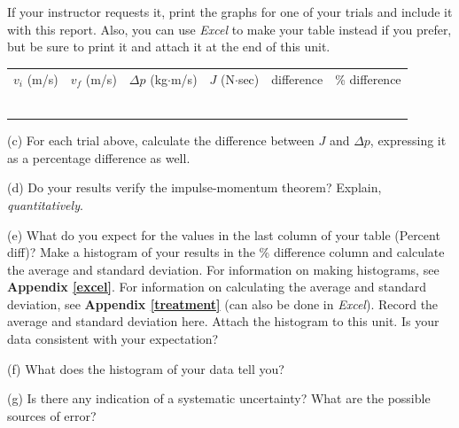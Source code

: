 If your instructor requests it, print the graphs for one of your trials and include it with this report.  Also, you can use {\it Excel} to make your table instead if you prefer, but be sure to print it and attach it at the end of this unit. 

\begin{center}
{\renewcommand{\arraystretch}{2.0}
\begin{tabular}{|c|c|c|C{0.8in}|c|C{1in}|} \hline 
$v_i$ (m/s) & $v_f$ (m/s) & $\Delta p$ (kg$\cdot$m/s) & $J$ (N$\cdot$sec) & difference & \% difference \\ 
\hhline{|=|=|=|=|=|=|}
& & & & & \\ \hline 
& & & & & \\ \hline 
& & & & & \\ \hline 
& & & & & \\ \hline 
& & & & & \\ \hline 
& & & & & \\ \hline 
\end{tabular} }
\end{center}

(c) For each trial above, calculate the difference between $J$ and $\Delta p$, expressing it as a percentage difference as well.  


(d) Do your results verify the impulse-momentum theorem? Explain, \textit{quantitatively}.
\answerspace{1in}


\pagebreak
(e) What do you expect for the values in the last column of your table (Percent diff)? Make a histogram of your results in the \% difference column and calculate the average and standard deviation. For information on making histograms, see \textbf{Appendix \ref{excel}}. For information on calculating the average and standard deviation, see \textbf{Appendix \ref{treatment}} (can also be done in \textit{Excel}). Record the average and standard 
deviation here. Attach the histogram to this unit. Is your data consistent with your expectation?
\answerspace{25mm}

(f) What does the histogram of your data tell you?
\answerspace{25mm}

(g) Is there any indication of a systematic uncertainty? What are the possible
sources of error?
\answerspace{25mm}
